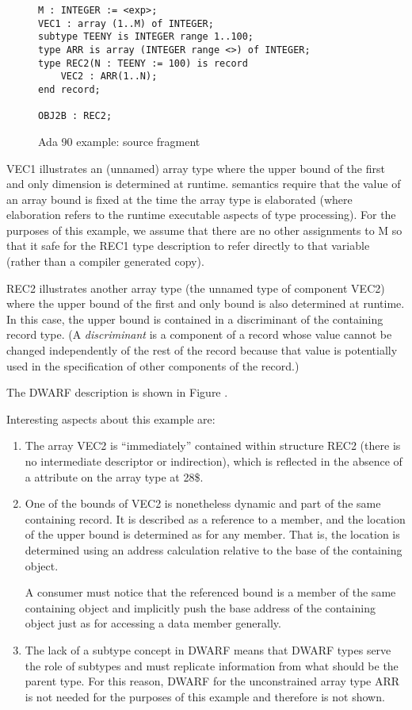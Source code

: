 \begin{figure}[here]
\begin{lstlisting}
M : INTEGER := <exp>;
VEC1 : array (1..M) of INTEGER;
subtype TEENY is INTEGER range 1..100;
type ARR is array (INTEGER range <>) of INTEGER;
type REC2(N : TEENY := 100) is record
    VEC2 : ARR(1..N);
end record;

OBJ2B : REC2;
\end{lstlisting}
\caption{Ada 90 example: source fragment}
\label{fig:adaexamplesourcefragment}
\end{figure}

VEC1 illustrates an (unnamed) array type where the upper bound
of the first and only dimension is determined at runtime. 
semantics require that the value of an array bound is fixed at
the time the array type is elaborated (where elaboration refers
to the runtime executable aspects of type processing). For
the purposes of this example, we assume that there are no
other assignments to M so that it safe for the REC1 type
description to refer directly to that variable (rather than
a compiler generated copy).

REC2 illustrates another array type (the unnamed type of
component VEC2) where the upper bound of the first and only
bound is also determined at runtime. In this case, the upper
bound is contained in a discriminant of the containing record
type. (A \textit{discriminant} is a component of a record whose value
cannot be changed independently of the rest of the record
because that value is potentially used in the specification
of other components of the record.)

The DWARF description is shown in 
Figure .


Interesting aspects about this example are:
\begin{enumerate}[1. ]
\item The array VEC2 is ``immediately'' contained within structure
REC2 (there is no intermediate descriptor or indirection),
which is reflected in the absence of a 
attribute on the array type at 28\$.

\item One of the bounds of VEC2 is nonetheless dynamic and part of
the same containing record. It is described as a reference to
a member, and the location of the upper bound is determined
as for any member. That is, the location is determined using
an address calculation relative to the base of the containing
object.  

A consumer must notice that the referenced bound is a
member of the same containing object and implicitly push the
base address of the containing object just as for accessing
a data member generally.

\item The lack of a subtype concept in DWARF means that DWARF types
serve the role of subtypes and must replicate information from
what should be the parent type. For this reason, DWARF for
the unconstrained array type ARR is not needed for the purposes
of this example and therefore is not shown.
\end{enumerate}

